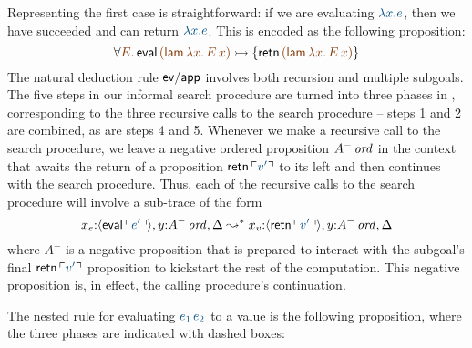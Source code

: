 Representing the first case is straightforward: if we are evaluating
$\obj{\lambda x.e}$, then we have succeeded and can return
$\obj{\lambda x.e}$.  This is encoded as the following proposition:
\[
\forall \lf{E}.\,
{\sf eval}\,\lf{({\sf lam}\,\lambda x.\,E\,x)}
   \lefti \{ {\sf retn}\,\lf{({\sf lam}\,\lambda x.\,E\,x)} \}
\]
The natural deduction rule ${\sf ev/app}$ involves both recursion and
multiple subgoals. The five steps in our informal search procedure are
turned into three phases in \sls, corresponding to the three recursive
calls to the search procedure -- steps 1 and 2 are combined, as are
steps 4 and 5. Whenever we make a recursive call to the search
procedure, we leave a negative ordered proposition ${A^-}\,{{\it ord}}$ in
the context that awaits the return of a proposition ${\sf
  retn}\,\interp{v'}$ to its left and then continues with the search
procedure. Thus, each of the recursive calls to the search procedure
will involve a sub-trace of the form
%
\[x_e{:}\susp{{\sf eval}\,\interp{e'}}, y{:}\istrue{A^-}, \Delta
  \leadsto^*
  x_v{:}\susp{{\sf retn}\,\interp{v'}}, y{:}\istrue{A^-}, \Delta
\]
%
where $A^-$ is a negative proposition that is prepared to interact
with the subgoal's final ${\sf retn}\,\interp{v'}$ proposition to
kickstart the rest of the computation.  This negative proposition is,
in effect, the calling procedure's continuation.

The nested rule for evaluating $\obj{e_1\,e_2}$ to a value is the
following proposition,
where the three phases are indicated with dashed boxes:

